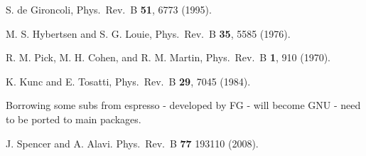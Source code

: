 \documentclass[twocolumn,prb,showpacs,superscriptaddress]{revtex4}
\begin{document}
\begin{thebibliography}{99}
S. de Gironcoli,
Phys.\ Rev.\ B {\bf 51}, 6773 (1995).

M. S. Hybertsen and S. G. Louie,
Phys.\ Rev.\ B {\bf 35}, 5585 (1976).

R. M. Pick, M. H. Cohen, and R. M. Martin,
Phys.\ Rev.\ B {\bf 1}, 910 (1970). 

K. Kunc and E. Tosatti,
Phys.\ Rev.\ B {\bf 29}, 7045 (1984).

Borrowing some subs from espresso - developed by FG - will become
GNU - need to be ported to main packages.

J. Spencer and A. Alavi.
Phys.\ Rev.\ B {\bf 77} 193110 (2008).


\end{thebibliography}
\end{document}
